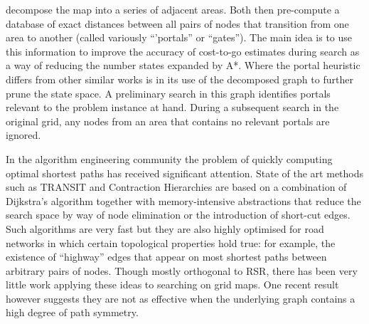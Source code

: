 decompose the map into a series of adjacent areas.  Both then pre-compute a
database of exact distances between all pairs of nodes that transition from one
area to another (called variously ``'portals'' or ``gates'').  The main idea
is to use this information to improve the accuracy of cost-to-go estimates
during search as a way of reducing the number states expanded by A*. 
Where the portal heuristic differs from other similar works
\cite{bjornsson06,sturtevant09,felner09} is in its use of the decomposed
graph to further prune the state space. A preliminary search in this graph 
identifies portals relevant to the problem instance at hand. 
During a subsequent search in the original grid, 
any nodes from an area that contains no relevant portals are ignored.
\par
In the algorithm engineering community the problem of quickly computing optimal
shortest paths has received significant attention.  State of the art methods
such as TRANSIT \cite{bast06} and Contraction Hierarchies \cite{geisberger08}
are based on a combination of Dijkstra's algorithm together with
memory-intensive abstractions that reduce the search space by way of node
elimination or the introduction of short-cut edges.  Such algorithms are very
fast but they are also highly optimised for road networks in which certain
topological properties hold true: for example, the existence of ``highway''
edges that appear on most shortest paths between arbitrary pairs of nodes.
Though mostly orthogonal to RSR, there has been very little work applying these
ideas to searching on grid maps. One recent result however \cite{sturtevant10}
suggests they are not as effective when the underlying graph contains a high
degree of path symmetry.
